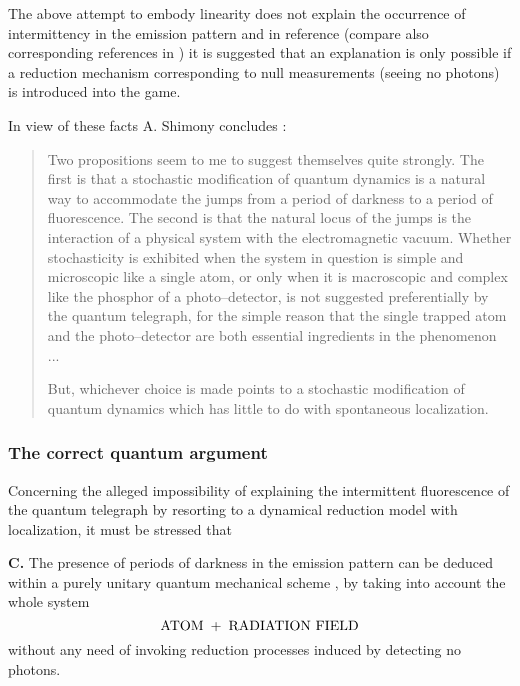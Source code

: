 \documentclass[12pt]{article}
\begin{document}
The above attempt to embody linearity does not explain the
occurrence of intermittency in the emission pattern and in
reference \cite{mp} (compare also corresponding references in
\cite{shi90}) it is suggested that an explanation is only possible
if a reduction mechanism corresponding to null measurements
(seeing no photons) is introduced into the game.

In view of these facts A. Shimony concludes \cite{shi90}:
\begin{quotation}
Two propositions seem to me to suggest themselves quite strongly.
The first is that a stochastic modification of quantum dynamics is
a natural way to accommodate the jumps from a period of darkness
to a period of fluorescence. The second is that the natural locus
of the jumps is the interaction of a physical system with the
electromagnetic vacuum. Whether stochasticity is exhibited when
the system in question is simple and microscopic like a single
atom, or only when it is macroscopic and complex like the phosphor
of a photo--detector, is not suggested preferentially by the
quantum telegraph, for the simple reason that the single trapped
atom and the photo--detector are both essential ingredients in the
phenomenon ...

But, whichever choice is made points to a stochastic modification
of quantum dynamics which has little to do with spontaneous
localization.
\end{quotation}

\subsubsection{The correct quantum argument} \label{sec1523}

Concerning the alleged impossibility of explaining the
intermittent fluorescence of the quantum telegraph by resorting to
a dynamical reduction model with localization, it must be stressed
that

{\bf C.} The presence of periods of darkness in the emission
pattern can be deduced within a purely unitary quantum mechanical
scheme \cite{ctd}, by taking into account the whole system
\[
\makebox{ATOM} \; + \; \makebox{RADIATION FIELD}
\]
without any need of invoking reduction processes induced by
detecting no photons.
\end{document}
